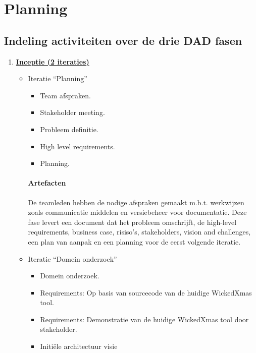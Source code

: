 
\section{Planning}
\subsection{Indeling activiteiten over de drie DAD fasen}
\begin{enumerate}
\item \underline{\textbf{Inceptie (2 iteraties)}}
		\begin{itemize}
		\item Iteratie ``Planning''
			\begin{itemize}
			\item Team afspraken.
			\item Stakeholder meeting.
			\item Probleem definitie.
			\item High level requirements.
			\item Planning.
			\end{itemize}
		\paragraph{Artefacten}
		De teamleden hebben de nodige afspraken gemaakt m.b.t. werkwijzen zoals
		communicatie middelen en versiebeheer voor documentatie. Deze fase levert
		een document dat het probleem omschrijft,  de high-level requirements,
		business case, risiso's, stakeholders, vision and challenges, een plan van
		aanpak en een planning voor de eerst volgende iteratie.
		\item Iteratie ``Domein onderzoek''
			\begin{itemize}
			\item Domein onderzoek.
			\item Requirements: Op basis van sourcecode van de huidige WickedXmas tool.
			\item Requirements: Demonstratie van de huidige WickedXmas tool door
			stakeholder.
			\item Initi\"ele architectuur visie
			\end{itemize}

\end{itemize}
\end{enumerate}
